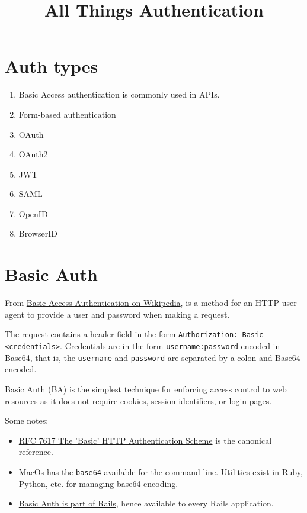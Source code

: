 \documentclass{article}
\title{All Things Authentication}
\begin{document}
\maketitle

\section{Auth types}


\begin{enumerate}
  \item Basic Access authentication is commonly used in APIs.
  \item Form-based authentication
  \item OAuth
  \item OAuth2
  \item JWT
  \item SAML
  \item OpenID
  \item BrowserID
\end{enumerate}

\section{Basic Auth}

From \href{https://en.wikipedia.org/wiki/Basic_access_authentication}{%
  Basic Access Authentication on Wikipedia}, is a method for an HTTP
user agent to provide a user and password when making a request.

The request contains a header field in the form \texttt{Authorization: Basic
 <credentials>}. Credentials are in the form \texttt{username:password} encoded in
Base64, that is, the \texttt{username} and \texttt{password} are separated by a colon
and Base64 encoded.

Basic Auth (BA) is the simplest technique for enforcing access control to
web resources as it does not require cookies, session identifiers, or
login pages.

Some notes:
\begin{itemize}
  \item \href{https://tools.ietf.org/html/rfc7617}{%
      RFC 7617 The 'Basic' HTTP Authentication Scheme} is the
    canonical reference.
  \item MacOs has the \texttt{base64} available for the command line. Utilities
    exist in Ruby, Python, etc. for managing base64 encoding.
  \item \href{https://api.rubyonrails.org/classes/ActionController/HttpAuthentication/Basic.html}{%
      Basic Auth is part of Rails}, hence available to every Rails application.
\end{itemize}
\end{document}
